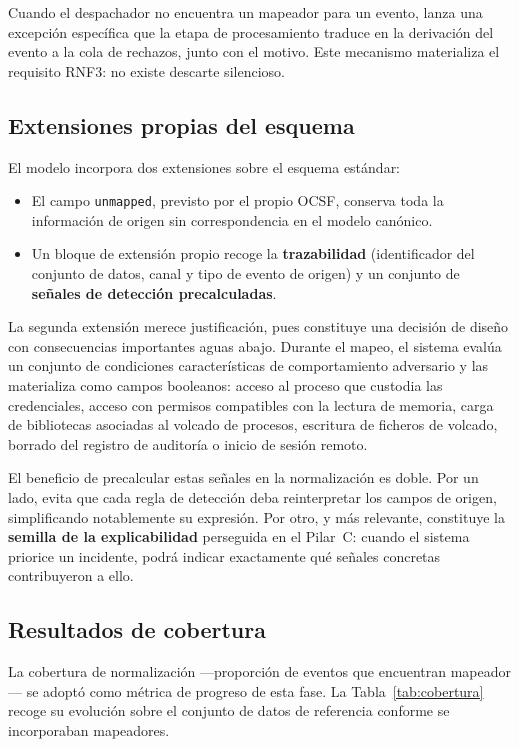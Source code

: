 Cuando el despachador no encuentra un mapeador para un evento, lanza una excepción específica
que la etapa de procesamiento traduce en la derivación del evento a la cola de rechazos,
junto con el motivo. Este mecanismo materializa el requisito RNF3: no existe descarte
silencioso.

\subsection{Extensiones propias del esquema}

El modelo incorpora dos extensiones sobre el esquema estándar:

\begin{itemize}
    \item El campo \texttt{unmapped}, previsto por el propio OCSF, conserva toda la
    información de origen sin correspondencia en el modelo canónico.
    \item Un bloque de extensión propio recoge la \textbf{trazabilidad} (identificador del
    conjunto de datos, canal y tipo de evento de origen) y un conjunto de \textbf{señales de
    detección precalculadas}.
\end{itemize}

La segunda extensión merece justificación, pues constituye una decisión de diseño con
consecuencias importantes aguas abajo. Durante el mapeo, el sistema evalúa un conjunto de
condiciones características de comportamiento adversario y las materializa como campos
booleanos: acceso al proceso que custodia las credenciales, acceso con permisos compatibles
con la lectura de memoria, carga de bibliotecas asociadas al volcado de procesos, escritura de
ficheros de volcado, borrado del registro de auditoría o inicio de sesión remoto.

El beneficio de precalcular estas señales en la normalización es doble. Por un lado, evita que
cada regla de detección deba reinterpretar los campos de origen, simplificando notablemente su
expresión. Por otro, y más relevante, constituye la \textbf{semilla de la explicabilidad}
perseguida en el Pilar~C: cuando el sistema priorice un incidente, podrá indicar exactamente
qué señales concretas contribuyeron a ello.

\subsection{Resultados de cobertura}

La cobertura de normalización —proporción de eventos que encuentran mapeador— se adoptó como
métrica de progreso de esta fase. La Tabla~\ref{tab:cobertura} recoge su evolución sobre el
conjunto de datos de referencia conforme se incorporaban mapeadores.

